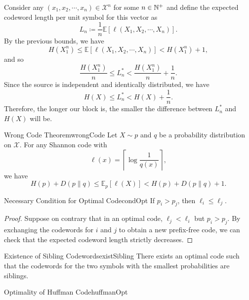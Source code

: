 \documentclass[math]{amznotes}
\theoremstyle{remark}
\begin{document}
Consider any $\left(x_1, x_2, \cdots, x_n\right) \in \mathcal{X}^n$ for some $n \in \mathbb{N}^+$ and define the expected codeword length per unit symbol for this vector as 
\begin{equation*}
    L_n \coloneqq \frac{1}{n}\mathbb{E}\left[\ell\left(X_1, X_2, \cdots, X_n\right)\right].
\end{equation*}
By the previous bounds, we have 
\begin{equation*}
    H\left(X_1^n\right) \leq \mathbb{E}\left[\ell\left(X_1, X_2, \cdots, X_n\right)\right] < H\left(X_1^n\right) + 1,
\end{equation*}
and so 
\begin{equation*}
    \frac{H\left(X_1^n\right)}{n} \leq L_n^* < \frac{H\left(X_1^n\right)}{n} + \frac{1}{n}.
\end{equation*}
Since the source is independent and identically distributed, we have 
\begin{equation*}
    H\left(X\right) \leq L_n^* < H\left(X\right) + \frac{1}{n}.
\end{equation*}
Therefore, the longer our block is, the smaller the difference between $L_n^*$ and $H\left(X\right)$ will be.
\begin{thmbox}{Wrong Code Theorem}{wrongCode}
    Let $X \sim p$ and $q$ be a probability distribution on $\mathcal{X}$. For any Shannon code with 
    \begin{equation*}
        \ell\left(x\right) = \left\lceil\log\frac{1}{q\left(x\right)}\right\rceil,
    \end{equation*}
    we have 
    \begin{equation*}
        H\left(p\right) + D\left(p \parallel q\right) \leq \mathbb{E}_p\left[\ell\left(X\right)\right] < H\left(p\right) + D\left(p \parallel q\right) + 1.
    \end{equation*}
\end{thmbox}
\begin{lembox}{Necessary Condition for Optimal Code}{condOpt}
    If $p_i > p_j$, then $\ell_i \leq \ell_j$.
    \tcblower
    \begin{proof}
        Suppose on contrary that in an optimal code, $\ell_j < \ell_i$ but $p_i > p_j$. By exchanging the codewords for $i$ and $j$ to obtain a new prefix-free code, we can check that the expected codeword length strictly decreases. 
    \end{proof}
\end{lembox}
\begin{lembox}{Existence of Sibling Codewords}{existSibling}
    There exists an optimal code such that the codewords for the two symbols with the smallest probabilities are siblings. 
\end{lembox}
\begin{thmbox}{Optimality of Huffman Code}{huffmanOpt}
    
\end{thmbox}
\end{document}
